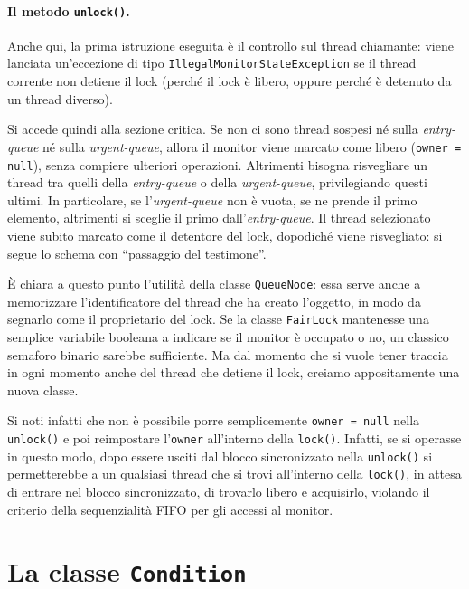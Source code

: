 \documentclass[a4paper,twoside]{article}
\newcommand\code{\lstinline[basicstyle=\normalsize\ttfamily]}
\begin{document}


\paragraph{Il metodo \texttt{unlock()}.}
Anche qui, la prima istruzione eseguita è il controllo sul thread chiamante: viene lanciata un'eccezione di tipo \code|IllegalMonitorStateException| se il thread corrente non detiene il lock (perché il lock è libero, oppure perché è detenuto da un thread diverso).

Si accede quindi alla sezione critica. Se non ci sono thread sospesi né sulla \emph{entry-queue} né sulla \emph{urgent-queue}, allora il monitor viene marcato come libero (\code|owner = null|), senza compiere ulteriori operazioni. Altrimenti bisogna risvegliare un thread tra quelli della \emph{entry-queue} o della \emph{urgent-queue}, privilegiando questi ultimi. In particolare, se l'\emph{urgent-queue} non è vuota, se ne prende il primo elemento, altrimenti si sceglie il primo dall'\emph{entry-queue}. Il thread selezionato viene subito marcato come il detentore del lock, dopodiché viene risvegliato: si segue lo schema con “passaggio del testimone”.

È chiara a questo punto l'utilità della classe \code|QueueNode|: essa serve anche a memorizzare l'identificatore del thread che ha creato l'oggetto, in modo da segnarlo come il proprietario del lock. Se la classe \code|FairLock| mantenesse una semplice variabile booleana a indicare se il monitor è occupato o no, un classico semaforo binario sarebbe sufficiente. Ma dal momento che si vuole tener traccia in ogni momento anche del thread che detiene il lock, creiamo appositamente una nuova classe.

Si noti infatti che non è possibile porre semplicemente \code|owner = null| nella \code|unlock()| e poi reimpostare l'\code|owner| all'interno della \code|lock()|. Infatti, se si operasse in questo modo, dopo essere usciti dal blocco sincronizzato nella \code|unlock()| si permetterebbe a un qualsiasi thread che si trovi all'interno della \code|lock()|, in attesa di entrare nel blocco sincronizzato, di trovarlo libero e acquisirlo, violando il criterio della sequenzialità FIFO per gli accessi al monitor.


\section{La classe \texttt{Condition}}
\end{document}
